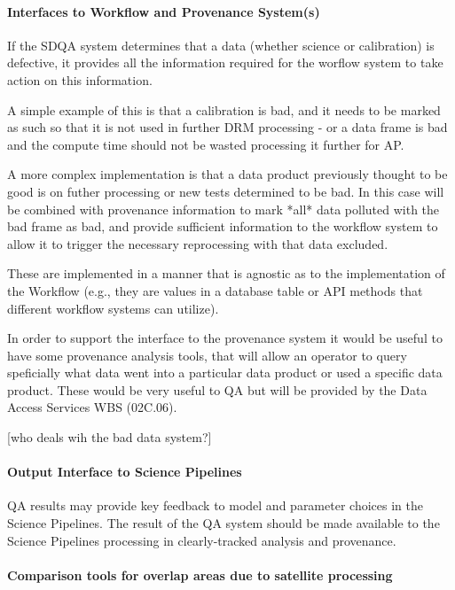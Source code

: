 \paragraph{Interfaces to Workflow and Provenance System(s)}
\label{sec:qaOutputInterfaceWorkflowSystem}

If the SDQA system determines that a data (whether science or calibration) is defective, it provides all the information required for the worflow system to take action on this information.

A simple example of this is that a calibration is bad, and it needs to be marked as such so that it is not used in further DRM processing - or a data frame is bad and the compute time should not be wasted processing it further for AP.

A more complex implementation is that a data product previously thought to be good is on futher processing or new tests determined to be bad. In this case will be combined with provenance information to mark *all* data polluted with the bad frame as bad, and provide sufficient information to the workflow system to allow it to trigger the necessary reprocessing with that data excluded.

These are implemented in a manner that is agnostic as to the implementation of the Workflow (e.g., they are values in a database table or API methods that different workflow systems can utilize).

In order to support the interface to the provenance system it would be useful to have some provenance analysis tools, that will allow an operator to query speficially what data went into a particular data product or used a specific data product. These would be very useful to QA but will be provided by the Data Access Services WBS (02C.06).

[who deals wih the bad data system?]

\paragraph{Output Interface to Science Pipelines}
\label{sec:qaOutputInterfaceSciencePipelines}

QA results may provide key feedback to model and parameter choices in the Science Pipelines.  The result of the QA system should be made available to the Science Pipelines processing in clearly-tracked analysis and provenance.


\paragraph{Comparison tools for overlap areas due to satellite processing}
\label{sec:qaComparisonSatelliteDataCenters}

